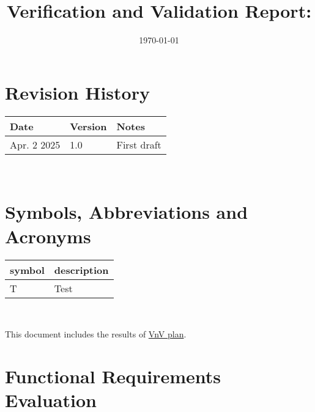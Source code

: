 \documentclass[12pt, titlepage]{article}
\begin{document}
\title{Verification and Validation Report: \progname} 
\author{\authname}
\date{\today}
	
\maketitle


\section{Revision History}

\begin{tabularx}{\textwidth}{p{3cm}p{2cm}X}
\toprule {\bf Date} & {\bf Version} & {\bf Notes}\\
\midrule
Apr. 2 2025 & 1.0 & First draft\\
\bottomrule
\end{tabularx}
\nocite{*}
~\newpage

\section{Symbols, Abbreviations and Acronyms}

\renewcommand{\arraystretch}{1.2}
\begin{tabular}{l l} 
  \toprule		
  \textbf{symbol} & \textbf{description}\\
  \midrule 
  T & Test\\
  \bottomrule
\end{tabular}\\


\newpage

\tableofcontents

\listoftables %

\listoffigures %

\newpage


This document includes the results of \href{https://github.com/V-AS/Two-tower-recommender-system/blob/main/docs/VnVPlan/VnVPlan.pdf}{VnV plan}.

\section{Functional Requirements Evaluation}
\end{document}
